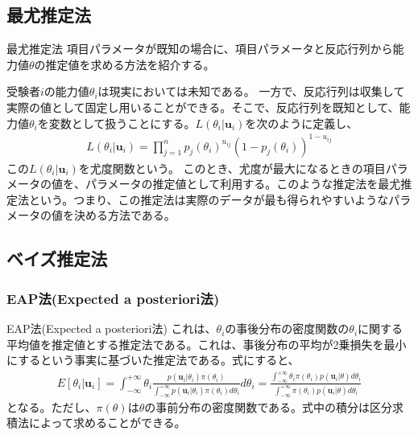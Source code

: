 \documentclass[aspectratio=169, dvipdfmx, 12pt]{beamer}
\begin{document}
\subsection{最尤推定法}
\begin{frame}
  \begin{block}{最尤推定法}
    項目パラメータが既知の場合に、項目パラメータと反応行列から能力値$\theta$の推定値を求める方法を紹介する。

  受験者$i$の能力値$\theta_i$は現実においては未知である。
  一方で、反応行列は収集して実際の値として固定し用いることができる。そこで、反応行列を既知として、能力値$\theta_i$を変数として扱うことにする。$L(\theta_i|\boldsymbol{u}_{i})$を次のように定義し、
  \begin{align}
    \label{01}
    \displaystyle L(\theta_i|\boldsymbol{u}_{i}) =\prod_{j = 1}^{n} p_{j}(\theta_i)^{u_{ij}} (1 - p_{j}(\theta_i))^{1 - u_{ij}}
  \end{align}
  この$L(\theta_i|\boldsymbol{u}_{i})$を尤度関数という。
  このとき、尤度が最大になるときの項目パラメータの値を、パラメータの推定値として利用する。このような推定法を最尤推定法という。つまり、この推定法は実際のデータが最も得られやすいようなパラメータの値を決める方法である。
  \end{block}
\end{frame}
\subsection{ベイズ推定法}
\subsubsection{EAP法(Expected a posteriori法)}
\begin{frame}
  \begin{block}{EAP法(Expected a posteriori法)}
    これは、$\theta_i$の事後分布の密度関数の$\theta_i$に関する平均値を推定値とする推定法である。これは、事後分布の平均が2乗損失を最小にするという事実に基づいた推定法である。式にすると、
    \begin{align}
      \displaystyle
      E[\theta_i | \boldsymbol{u}_i] = \int_{-\infty}^{+\infty} \theta_i \frac{p(\boldsymbol{u}_i | \theta_i)\pi(\theta_i)}{\displaystyle \int_{-\infty}^{+\infty} p(\boldsymbol{u}_i | \theta_i)\pi(\theta_i) d\theta_i} d\theta_i =  \frac{\displaystyle\int_{-\infty}^{+\infty} \theta_i \pi(\theta_i)p(\boldsymbol{u}_i|\theta) d\theta_i}{\displaystyle\int_{-\infty}^{+\infty}  \pi(\theta_i)p(\boldsymbol{u}_i|\theta) d\theta_i}
    \end{align}
    となる。ただし、$\pi(\theta)$は$\theta$の事前分布の密度関数である。式中の積分は区分求積法によって求めることができる。
  \end{block}
\end{frame}
\end{document}
